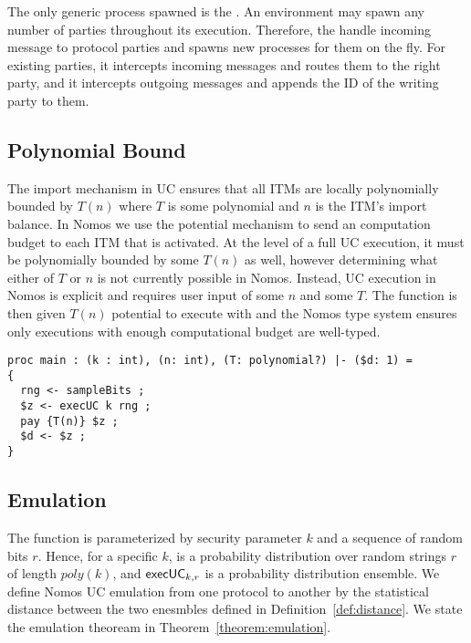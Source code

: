 The only generic process spawned is the .
An environment may spawn any number of parties throughout its execution.
Therefore, the  handle incoming message to protocol parties and spawns new processes for them on the fly.
For existing parties, it intercepts incoming messages and routes them to the right party, and it intercepts outgoing messages and appends the ID of the writing party to them. 


\subsection{Polynomial Bound}
The import mechanism in UC ensures that all ITMs are locally polynomially bounded by $T(n)$ where $T$ is some polynomial and $n$ is the ITM's import balance.
In Nomos we use the potential mechanism to send an computation budget to each ITM that is activated.
At the level of a full UC execution, it must be polynomially bounded by some $T(n)$ as well, however determining what either of $T$ or $n$ is not currently possible in Nomos.
Instead, UC execution in Nomos is explicit and requires user input of some $n$ and some $T$.
The  function is then given $T(n)$ potential to execute with and the Nomos type system ensures only executions with enough computational budget are well-typed.

\begin{lstlisting}[basicstyle=\small\ttfamily]
proc main : (k : int), (n: int), (T: polynomial?) |- ($d: 1) = 
{
  rng <- sampleBits ;
  $z <- execUC k rng ;
  pay {T(n)} $z ;
  $d <- $z ;
}
\end{lstlisting}


\subsection{Emulation}
The  function is parameterized by security parameter $k$ and a sequence of random bits $r$. 
Hence, for a specific $k$,  is a probability distribution over random strings $r$ of length $poly(k)$, and ${\mathsf {execUC}}_{k,r}$ is a probability distribution ensemble.
We define Nomos UC emulation from one protocol to another by the statistical distance between the two enesmbles defined in Definition~\ref{def:distance}.
We state the emulation theoream in Theorem~\ref{theorem:emulation}.

